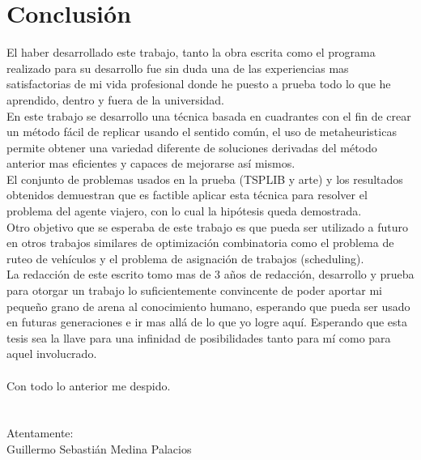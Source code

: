 \section*{Conclusión}

El haber desarrollado este trabajo, tanto la obra escrita como el programa realizado para su desarrollo fue sin duda una de las experiencias mas satisfactorias de mi vida profesional donde he puesto a prueba todo lo que he aprendido, dentro y fuera de la universidad.\\
\hspace*{1cm}En este trabajo se desarrollo una técnica basada en cuadrantes con el fin de crear un método fácil de replicar usando el sentido común, el uso de metaheuristicas permite obtener una variedad diferente de soluciones derivadas del método anterior mas eficientes y capaces de mejorarse así mismos.\\
\hspace*{1cm}El conjunto de problemas usados en la prueba (TSPLIB y arte) y los resultados obtenidos demuestran que es factible aplicar esta técnica para resolver el problema del agente viajero, con lo cual la hipótesis queda demostrada.\\
\hspace*{1cm}Otro objetivo que se esperaba de este trabajo es que pueda ser utilizado a futuro en otros trabajos similares de optimización combinatoria como el problema de ruteo de vehículos y el problema de asignación de trabajos (scheduling).\\
\hspace*{1cm}La redacción de este escrito tomo mas de 3 años de redacción, desarrollo y prueba para otorgar un trabajo lo suficientemente convincente de poder aportar mi pequeño grano de arena al conocimiento humano, esperando que pueda ser usado en futuras generaciones e ir mas allá de lo que yo logre aquí. Esperando que esta tesis sea la llave para una infinidad de posibilidades tanto para mí como para aquel involucrado.\\\\
\hspace*{1cm}Con todo lo anterior me despido.\\\\\\
Atentamente:\\
Guillermo Sebastián Medina Palacios


\newpage
